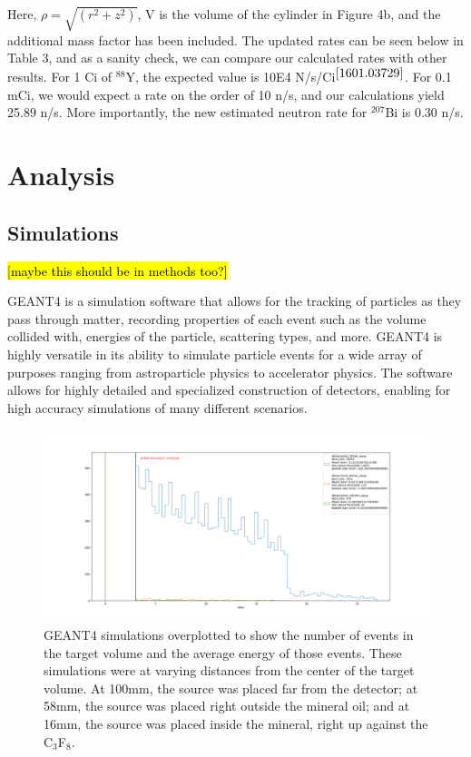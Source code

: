 \documentclass[%
12pt,
twoside,
reprint,
amsmath,amssymb,
aps,
]{article}
\begin{document}
	\noindent Here, $\rho = \sqrt{(r^{2} + z^{2})}$, V is the volume of the cylinder in Figure 4b, and the additional mass factor has been included. The updated rates can be seen below in Table 3, and as a sanity check, we can compare our calculated rates with other results. For 1 Ci of $^{88}$Y, the expected value is 10E4 N/s/Ci$^{\cite{1601.03729}}$. For 0.1 mCi, we would expect a rate on the order of 10 n/s, and our calculations yield 25.89 n/s. More importantly, the new estimated neutron rate for $^{207}$Bi is 0.30 n/s.

	\section{Analysis}
	\subsection{Simulations}
	\noindent \hl{[maybe this should be in methods too?]}
	\par GEANT4 is a simulation software that allows for the tracking of particles as they pass through matter, recording properties of each event such as the volume collided with, energies of the particle, scattering types, and more. GEANT4 is highly versatile in its ability to simulate particle events for a wide array of purposes ranging from astroparticle physics to accelerator physics. The software allows for highly detailed and specialized construction of detectors, enabling for high accuracy simulations of many different scenarios.
	
	\begin{figure}[H]
		\includegraphics[scale = 0.42, center]{Images/histogram_distancetest.png}
		\caption{\label{tab:table-name} GEANT4 simulations overplotted to show the number of events in the target volume and the average energy of those events. These simulations were at varying distances from the center of the target volume. At 100mm, the source was placed far from the detector; at 58mm, the source was placed right outside the mineral oil; and at 16mm, the source was placed inside the mineral, right up against the C$_{3}$F$_{8}$.}
	\end{figure}
	
\end{document}
